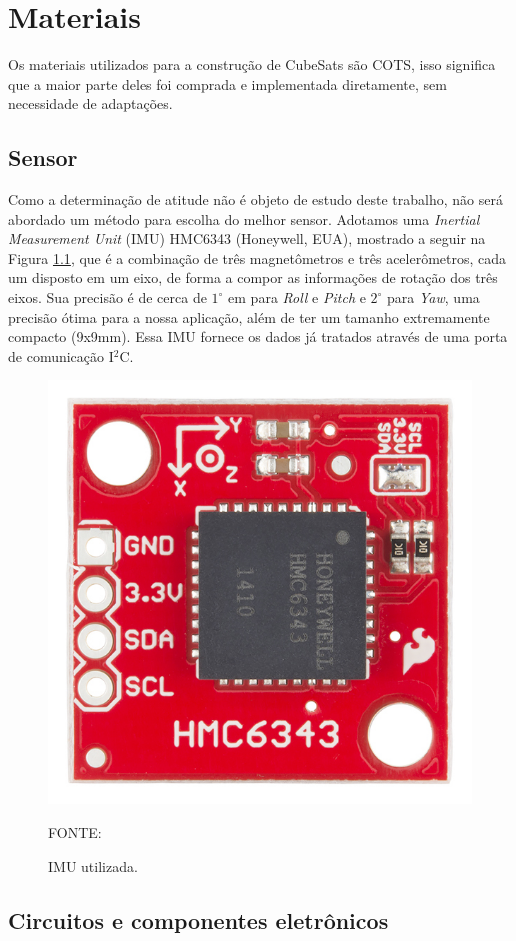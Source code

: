 \documentclass[
	12pt,				%
	openany,			%
	twoside,			%
	a4paper,			%
	english,			%
	french,				%
	spanish,			%
	brazil,				%
	oldfontcommands
	]{abntex2}
\begin{document}
\chapter{Materiais}

Os materiais utilizados para a construção de CubeSats são COTS, isso significa que a maior parte deles foi comprada e implementada diretamente, sem necessidade de adaptações.

\section{Sensor}

Como a determinação de atitude não é objeto de estudo deste trabalho, não será abordado um método para escolha do melhor sensor. Adotamos uma \textit{Inertial Measurement Unit} (IMU) HMC6343 (Honeywell, EUA), mostrado a seguir na Figura \ref{fig:IMU}, que é a combinação de três magnetômetros e três acelerômetros, cada um disposto em um eixo, de forma a compor as informações de rotação dos três eixos. Sua precisão é de cerca de $1^{\circ}$ em para \textit{Roll} e \textit{Pitch} e $2^{\circ}$ para \textit{Yaw}, uma precisão ótima para a nossa aplicação, além de ter um tamanho extremamente compacto (9x9mm). Essa IMU fornece os dados já tratados através de uma porta de comunicação I$^{2}$C.

\begin{figure}[th]
	\caption{IMU utilizada.}
	\centering
	\includegraphics[width=0.425\linewidth]{./figs/IMU-HMC6343}
	
	\begin{small}
		FONTE: \cite{IMU}
	\end{small}
	\label{fig:IMU}
\end{figure}


\section{Circuitos e componentes eletrônicos}
\end{document}
